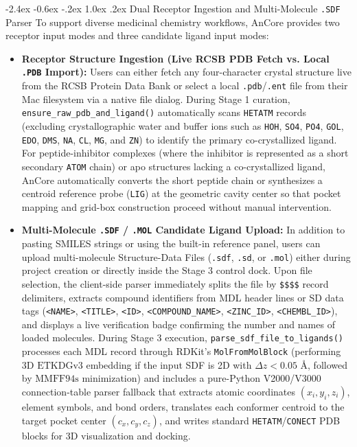 \documentclass[11pt,a4paper]{article}
\makeatletter
\renewcommand{\subsection}{\@startsection{subsection}{2}{\z@}%
  {-2.4ex \@plus -0.6ex \@minus -.2ex}%
  {1.0ex \@plus .2ex}%
  {\normalfont\large\bfseries\color{primary}}}
\makeatother
\begin{document}
\subsection{Dual Receptor Ingestion and Multi-Molecule \texttt{.SDF} Parser}
\noindent To support diverse medicinal chemistry workflows, AnCore provides two receptor input modes and three candidate ligand input modes:
\begin{itemize}
  \setlength{\itemsep}{3pt}
  \setlength{\parskip}{0pt}
  \item \textbf{Receptor Structure Ingestion (Live RCSB PDB Fetch vs. Local \texttt{.PDB} Import):} Users can either fetch any four-character crystal structure live from the RCSB Protein Data Bank or select a local \texttt{.pdb}/\texttt{.ent} file from their Mac filesystem via a native file dialog. During Stage 1 curation, \texttt{ensure\_raw\_pdb\_and\_ligand()} automatically scans \texttt{HETATM} records (excluding crystallographic water and buffer ions such as \texttt{HOH}, \texttt{SO4}, \texttt{PO4}, \texttt{GOL}, \texttt{EDO}, \texttt{DMS}, \texttt{NA}, \texttt{CL}, \texttt{MG}, and \texttt{ZN}) to identify the primary co-crystallized ligand. For peptide-inhibitor complexes (where the inhibitor is represented as a short secondary \texttt{ATOM} chain) or apo structures lacking a co-crystallized ligand, AnCore automatically converts the short peptide chain or synthesizes a centroid reference probe (\texttt{LIG}) at the geometric cavity center so that pocket mapping and grid-box construction proceed without manual intervention.
  \item \textbf{Multi-Molecule \texttt{.SDF} / \texttt{.MOL} Candidate Ligand Upload:} In addition to pasting SMILES strings or using the built-in reference panel, users can upload multi-molecule Structure-Data Files (\texttt{.sdf}, \texttt{.sd}, or \texttt{.mol}) either during project creation or directly inside the Stage 3 control dock. Upon file selection, the client-side parser immediately splits the file by \texttt{\$\$\$\$} record delimiters, extracts compound identifiers from MDL header lines or SD data tags (\texttt{<NAME>}, \texttt{<TITLE>}, \texttt{<ID>}, \texttt{<COMPOUND\_NAME>}, \texttt{<ZINC\_ID>}, \texttt{<CHEMBL\_ID>}), and displays a live verification badge confirming the number and names of loaded molecules. During Stage 3 execution, \texttt{parse\_sdf\_file\_to\_ligands()} processes each MDL record through RDKit's \texttt{MolFromMolBlock} (performing 3D $\text{ETKDGv3}$ embedding if the input SDF is 2D with $\Delta z < 0.05\text{ \AA}$, followed by $\text{MMFF94s}$ minimization) and includes a pure-Python V2000/V3000 connection-table parser fallback that extracts atomic coordinates $(x_i, y_i, z_i)$, element symbols, and bond orders, translates each conformer centroid to the target pocket center $(c_x, c_y, c_z)$, and writes standard \texttt{HETATM}/\texttt{CONECT} PDB blocks for 3D visualization and docking.
\end{itemize}
\end{document}
